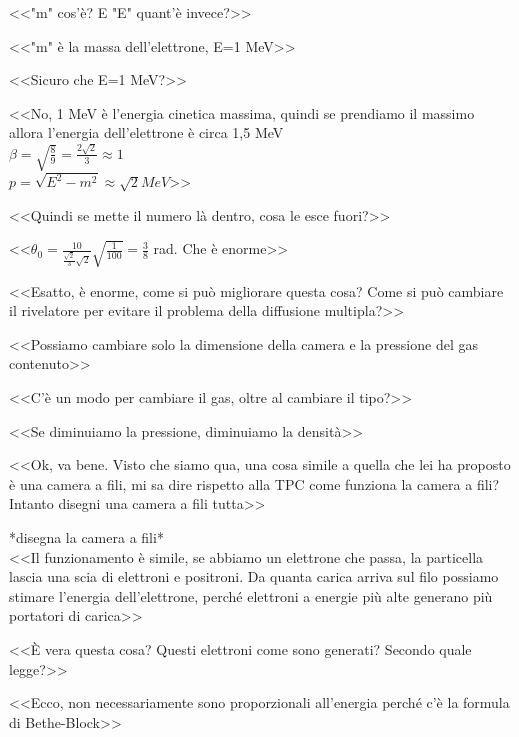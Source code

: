 \documentclass[../main.tex]{subfiles}
\begin{document}
\begin{enumerate}
{\begin{flushright}
        \end{flushright}
        <<"m" cos'è? E "E" quant'è invece?>>
        \begin{flushright}
        <<"m" è la massa dell'elettrone, E=1 MeV>>
        \end{flushright}
        <<Sicuro che E=1 MeV?>>
        \begin{flushright}
        <<No, 1 MeV è l'energia cinetica massima, quindi se prendiamo il massimo allora l'energia dell'elettrone è circa 1,5 MeV\\
        $\beta=\sqrt{\frac{8}{9}}=\frac{2\sqrt{2}}{3}\approx 1$\\
        $p=\sqrt{E^2-m^2}\approx\sqrt{2} MeV$>>
        \end{flushright}
        <<Quindi se mette il numero là dentro, cosa le esce fuori?>>
        \begin{flushright}
        <<\(\theta_0=\frac{10}{\frac{\sqrt{2}}{3}\sqrt{2}}\sqrt{\frac{1}{100}}=\frac{3}{8}\) rad. Che è enorme>>
        \end{flushright}
        <<Esatto, è enorme, come si può migliorare questa cosa? Come si può cambiare il rivelatore per evitare il problema della diffusione multipla?>>
        \begin{flushright}
        <<Possiamo cambiare solo la dimensione della camera e la pressione del gas contenuto>>
        \end{flushright}
        <<C'è un modo per cambiare il gas, oltre al cambiare il tipo?>>
        \begin{flushright}
        <<Se diminuiamo la pressione, diminuiamo la densità>>
        \end{flushright}
        <<Ok, va bene. Visto che siamo qua, una cosa simile a quella che lei ha proposto è una camera a fili, mi sa dire rispetto alla TPC come funziona la camera a fili? Intanto disegni una camera a fili tutta>>
        \begin{flushright}
        *disegna la camera a fili*\\
        <<Il funzionamento è simile, se abbiamo un elettrone che passa, la particella lascia una scia di elettroni e positroni. Da quanta carica arriva sul filo possiamo stimare l'energia dell'elettrone, perché elettroni a energie più alte generano più portatori di carica>>
        \end{flushright}
        <<È vera questa cosa? Questi elettroni come sono generati? Secondo quale legge?>>
        \begin{flushright}
        <<Ecco, non necessariamente sono proporzionali all'energia perché c'è la formula di Bethe-Block>>\\

\end{flushright}}
\end{enumerate}
\end{document}
